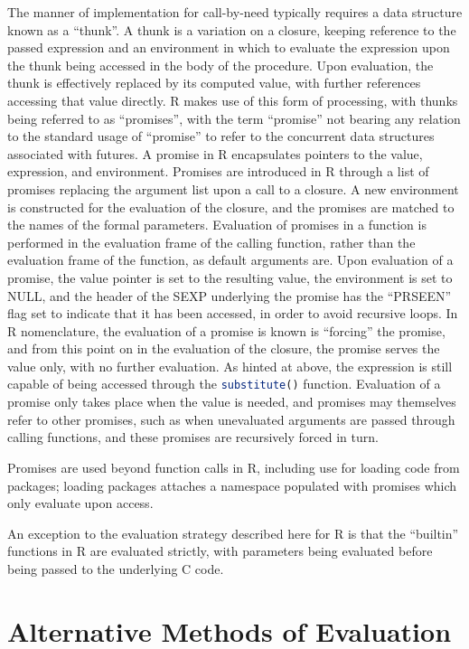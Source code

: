 \documentclass[10pt,a4paper]{article}
\begin{document}
The manner of implementation for call-by-need typically requires a data structure known as a ``thunk''\cite{ingerman1961thunks}.
A thunk is a variation on a closure, keeping reference to the passed expression and an environment in which to evaluate the expression upon the thunk being accessed in the body of the procedure.
Upon evaluation, the thunk is effectively replaced by its computed value, with further references accessing that value directly.
R makes use of this form of processing, with thunks being referred to as ``promises'', with the term ``promise'' not bearing any relation to the standard usage of ``promise'' to refer to the concurrent data structures associated with futures\cite{rcore2020lang:promise}.
A promise in R encapsulates pointers to the value, expression, and environment.
Promises are introduced in R through a list of promises replacing the argument list upon a call to a closure.
A new environment is constructed for the evaluation of the closure, and the promises are matched to the names of the formal parameters.
Evaluation of promises in a function is performed in the evaluation frame of the calling function, rather than the evaluation frame of the function, as default arguments are.
Upon evaluation of a promise, the value pointer is set to the resulting value, the environment is set to NULL, and the header of the SEXP underlying the promise has the ``PRSEEN'' flag set to indicate that it has been accessed, in order to avoid recursive loops.
In R nomenclature, the evaluation of a promise is known is ``forcing'' the promise, and from this point on in the evaluation of the closure, the promise serves the value only, with no further evaluation.
As hinted at above, the expression is still capable of being accessed through the \lstinline[language=R]{substitute()} function.
Evaluation of a promise only takes place when the value is needed, and promises may themselves refer to other promises, such as when unevaluated arguments are passed through calling functions, and these promises are recursively forced in turn.

Promises are used beyond function calls in R, including use for loading code from packages; loading packages attaches a namespace populated with promises which only evaluate upon access.

An exception to the evaluation strategy described here for R is that the ``builtin'' functions in R are evaluated strictly, with parameters being evaluated before being passed to the underlying C code.

\section{Alternative Methods of Evaluation}
\end{document}
